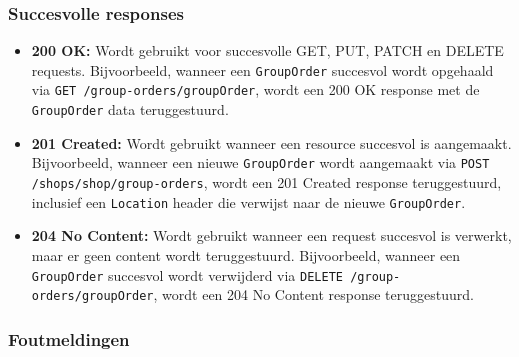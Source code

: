 \subsubsection{Succesvolle responses}

\begin{itemize}
  \item \textbf{200 OK:} Wordt gebruikt voor succesvolle GET, PUT, PATCH en DELETE requests. Bijvoorbeeld, wanneer een \texttt{GroupOrder} succesvol wordt opgehaald via \texttt{GET /group-orders/{groupOrder}}, wordt een 200 OK response met de \texttt{GroupOrder} data teruggestuurd.
  \item \textbf{201 Created:} Wordt gebruikt wanneer een resource succesvol is aangemaakt. Bijvoorbeeld, wanneer een nieuwe \texttt{GroupOrder} wordt aangemaakt via \texttt{POST /shops/{shop}/group-orders}, wordt een 201 Created response teruggestuurd, inclusief een \texttt{Location} header die verwijst naar de nieuwe \texttt{GroupOrder}.
  \item \textbf{204 No Content:} Wordt gebruikt wanneer een request succesvol is verwerkt, maar er geen content wordt teruggestuurd. Bijvoorbeeld, wanneer een \texttt{GroupOrder} succesvol wordt verwijderd via \texttt{DELETE /group-orders/{groupOrder}}, wordt een 204 No Content response teruggestuurd.
\end{itemize}

\subsubsection{Foutmeldingen}

